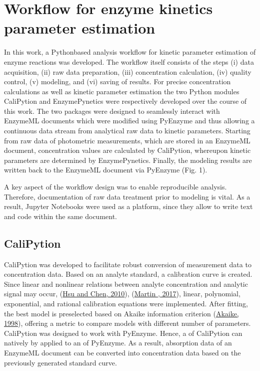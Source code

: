 \documentclass[letterpaper,12pt,english]{jupyterBook}
\begin{document}
\section{Workflow for enzyme kinetics parameter estimation}
\label{\detokenize{results:workflow-for-enzyme-kinetics-parameter-estimation}}
\sphinxAtStartPar
In this work, a Python\sphinxhyphen{}based analysis workflow for kinetic parameter estimation of enzyme reactions was developed. The workflow itself consists of the steps (i) data acquisition, (ii) raw data preparation, (iii) concentration calculation, (iv) quality control, (v) modeling, and (vi) saving of results. For precise concentration calculations as well as kinetic parameter estimation the two Python modules CaliPytion and EnzymePynetics were respectively developed over the course of this work.
The two packages were designed to seamlessly interact with EnzymeML documents which were modified using PyEnzyme and thus allowing a continuous data stream from analytical raw data to kinetic parameters. Starting from raw data of photometric measurements, which are stored in an EnzymeML document, concentration values are calculated by CaliPytion, whereupon kinetic parameters are determined by EnzymePynetics. Finally, the modeling results are written back to the EnzymeML document via PyEnzyme (Fig. 1).

\sphinxAtStartPar
{}

\sphinxAtStartPar
A key aspect of the workflow design was to enable reproducible analysis. Therefore, documentation of raw data treatment prior to modeling is vital. As a result, Jupyter Notebooks were used as a platform, since they allow to write text and code within the same document.


\subsection{CaliPytion}
\label{\detokenize{results:calipytion}}
\sphinxAtStartPar
CaliPytion was developed to facilitate robust conversion of measurement data to concentration data. Based on an analyte standard, a calibration curve is created. Since linear and non\sphinxhyphen{}linear relations between analyte concentration and analytic signal may occur, (\hyperlink{cite.references:id14}{Hsu and Chen, 2010}), (\hyperlink{cite.references:id15}{Martin , 2017}), linear, polynomial, exponential, and rational calibration equations were implemented. After fitting, the best model is preselected based on Akaike information criterion (\hyperlink{cite.references:id17}{Akaike, 1998}), offering a metric to compare models with different number of parameters. CaliPytion was designed to work with PyEnzyme. Hence, a  of CaliPytion can natively by applied to an  of PyEnzyme. As a result, absorption data of an EnzymeML document can be converted into concentration data based on the previously generated standard curve.
\end{document}

